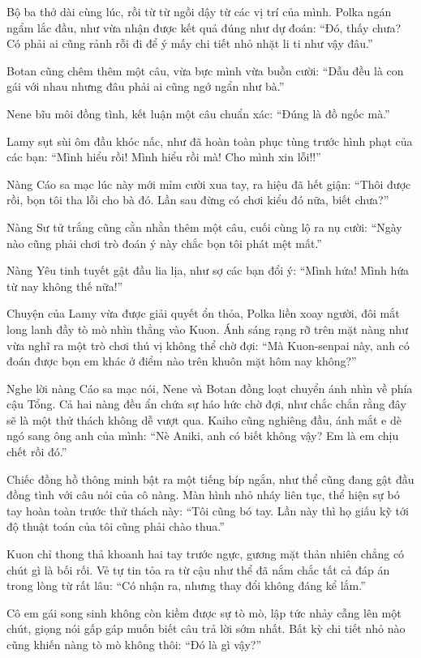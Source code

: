 \documentclass[../main.tex]{subfiles}
\begin{document}
Bộ ba thở dài cùng lúc, rồi từ từ ngồi dậy từ các vị trí của mình. Polka ngán ngẩm lắc đầu, như vừa nhận được kết quả đúng như dự đoán: ``Đó, thấy chưa? Có phải ai cũng rảnh rỗi đi để ý mấy chi tiết nhỏ nhặt li ti như vậy đâu.''

Botan cũng chêm thêm một câu, vừa bực mình vừa buồn cười: ``Dẫu đều là con gái với nhau nhưng đâu phải ai cũng ngớ ngẩn như bà.''

Nene bĩu môi đồng tình, kết luận một câu chuẩn xác: ``Đúng là đồ ngốc mà.''

Lamy sụt sùi ôm đầu khóc nấc, như đã hoàn toàn phục tùng trước hình phạt của các bạn: ``Mình hiểu rồi! Mình hiểu rồi mà! Cho mình xin lỗi!!''

Nàng Cáo sa mạc lúc này mới mỉm cười xua tay, ra hiệu đã hết giận: ``Thôi được rồi, bọn tôi tha lỗi cho bà đó. Lần sau đừng có chơi kiểu đó nữa, biết chưa?''

Nàng Sư tử trắng cũng cằn nhằn thêm một câu, cuối cùng lộ ra nụ cười: ``Ngày nào cũng phải chơi trò đoán ý này chắc bọn tôi phát mệt mất.''

Nàng Yêu tinh tuyết gật đầu lia lịa, như sợ các bạn đổi ý: ``Mình hứa! Mình hứa từ nay không thế nữa!''

Chuyện của Lamy vừa được giải quyết ổn thỏa, Polka liền xoay người, đôi mắt long lanh đầy tò mò nhìn thẳng vào Kuon. Ánh sáng rạng rỡ trên mặt nàng như vừa nghĩ ra một trò chơi thú vị không thể chờ đợi: ``Mà Kuon-senpai này, anh có đoán được bọn em khác ở điểm nào trên khuôn mặt hôm nay không?''

Nghe lời nàng Cáo sa mạc nói, Nene và Botan đồng loạt chuyển ánh nhìn về phía cậu Tổng. Cả hai nàng đều ẩn chứa sự háo hức chờ đợi, như chắc chắn rằng đây sẽ là một thử thách không dễ vượt qua. Kaiho cũng nghiêng đầu, ánh mắt e dè ngó sang ông anh của mình: ``Nè Aniki, anh có biết không vậy? Em là em chịu chết rồi đó.''

Chiếc đồng hồ thông minh bật ra một tiếng bíp ngắn, như thể cũng đang gật đầu đồng tình với câu nói của cô nàng. Màn hình nhỏ nháy liên tục, thể hiện sự bó tay hoàn toàn trước thử thách này: ``Tôi cũng bó tay. Lần này thì họ giấu kỹ tới độ thuật toán của tôi cũng phải chào thua.''

Kuon chỉ thong thả khoanh hai tay trước ngực, gương mặt thản nhiên chẳng có chút gì là bối rối. Vẻ tự tin tỏa ra từ cậu như thể đã nắm chắc tất cả đáp án trong lòng từ rất lâu: ``Có nhận ra, nhưng thay đổi không đáng kể lắm.''

Cô em gái song sinh không còn kiềm được sự tò mò, lập tức nhảy cẫng lên một chút, giọng nói gấp gáp muốn biết câu trả lời sớm nhất. Bất kỳ chi tiết nhỏ nào cũng khiến nàng tò mò không thôi: ``Đó là gì vậy?''
\end{document}
